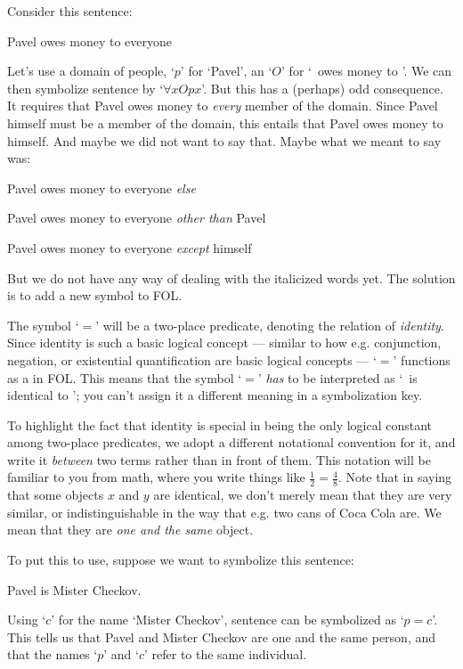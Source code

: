 Consider this sentence:
\begin{earg}
\item[\ex{else1}] Pavel owes money to everyone
\end{earg}
Let's use a domain of people, `$p$' for `Pavel', an `$O$' for `\blank \ owes money to \blank'.   We can then symbolize sentence  by `$\forall x Opx$'. But this has a (perhaps) odd consequence. It requires that Pavel owes money to \emph{every} member of the domain.  Since Pavel himself must be a member of the domain, this entails that Pavel owes money to himself. And maybe we did not want to say that. Maybe what we meant to say was:
	\begin{earg}
		\item[\ex{else1b}] Pavel owes money to everyone \emph{else}
		\item[\ex{else1c}] Pavel owes money to everyone \emph{other than} Pavel
		\item[\ex{else1d}] Pavel owes money to everyone \emph{except} himself
	\end{earg}
But we do not have any way of dealing with the italicized words yet. The solution is to add a new symbol to FOL.

The symbol `$=$' will be a two-place predicate, denoting the relation of \emph{identity}. Since identity is such a basic logical concept --- similar to how e.g. conjunction, negation, or existential quantification are basic logical concepts --- `$=$'  functions as a  in FOL.  This means that the symbol `$=$'  \emph{has} to be interpreted as `\blank\ is identical to \blank'; you can't assign it a different meaning in a symbolization key.

To highlight the fact that identity is special in being the only logical constant among two-place predicates, we adopt a different notational convention for it, and write it \emph{between} two terms rather than in front of them.  This notation will be familiar to you from math, where you write things like $\frac{1}{2} = \frac{4}{8}$.  Note that in saying that some objects $x$ and $y$ are identical, we don't merely mean that they are very similar, or indistinguishable in the way that e.g. two cans of Coca Cola are.  We mean that they are \emph{one and the same} object.

To put this to use, suppose we want to symbolize this sentence:
\begin{earg}
\item[\ex{else2}] Pavel is Mister Checkov.
\end{earg}
Using `$c$' for the name `Mister Checkov', sentence  can be symbolized as `$p=c$'. This tells us that Pavel and Mister Checkov are one and the same person, and that the names `$p$' and `$c$' refer to the same individual.

